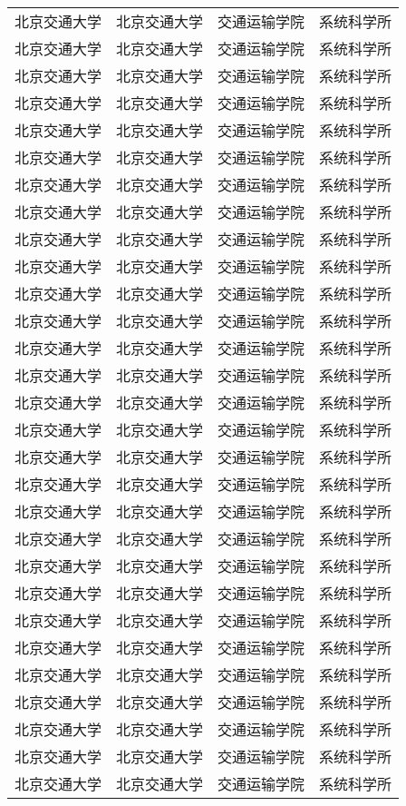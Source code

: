 {\begin{longtable}{@{\extracolsep{\fill}}cccc@{}}
北京交通大学&北京交通大学&交通运输学院&系统科学所\\
北京交通大学&北京交通大学&交通运输学院&系统科学所\\
北京交通大学&北京交通大学&交通运输学院&系统科学所\\
北京交通大学&北京交通大学&交通运输学院&系统科学所\\
北京交通大学&北京交通大学&交通运输学院&系统科学所\\
北京交通大学&北京交通大学&交通运输学院&系统科学所\\
北京交通大学&北京交通大学&交通运输学院&系统科学所\\
北京交通大学&北京交通大学&交通运输学院&系统科学所\\
北京交通大学&北京交通大学&交通运输学院&系统科学所\\
北京交通大学&北京交通大学&交通运输学院&系统科学所\\
北京交通大学&北京交通大学&交通运输学院&系统科学所\\
北京交通大学&北京交通大学&交通运输学院&系统科学所\\
北京交通大学&北京交通大学&交通运输学院&系统科学所\\
北京交通大学&北京交通大学&交通运输学院&系统科学所\\
北京交通大学&北京交通大学&交通运输学院&系统科学所\\
北京交通大学&北京交通大学&交通运输学院&系统科学所\\
北京交通大学&北京交通大学&交通运输学院&系统科学所\\
北京交通大学&北京交通大学&交通运输学院&系统科学所\\
北京交通大学&北京交通大学&交通运输学院&系统科学所\\
北京交通大学&北京交通大学&交通运输学院&系统科学所\\
北京交通大学&北京交通大学&交通运输学院&系统科学所\\
北京交通大学&北京交通大学&交通运输学院&系统科学所\\
北京交通大学&北京交通大学&交通运输学院&系统科学所\\
北京交通大学&北京交通大学&交通运输学院&系统科学所\\
北京交通大学&北京交通大学&交通运输学院&系统科学所\\
北京交通大学&北京交通大学&交通运输学院&系统科学所\\
北京交通大学&北京交通大学&交通运输学院&系统科学所\\
北京交通大学&北京交通大学&交通运输学院&系统科学所\\
北京交通大学&北京交通大学&交通运输学院&系统科学所\\

\end{longtable}}
